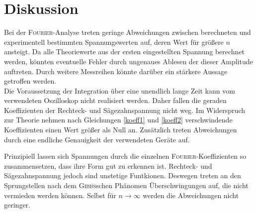 \section{Diskussion}
\label{sec:Diskussion}

Bei der \textsc{Fourier}-Analyse treten geringe Abweichungen zwischen berechneten und experimentell bestimmten Spannungswerten auf, deren Wert für größere $n$ ansteigt. 
Da alle Theoriewerte aus der ersten eingestellten Spannung berechnet werden, könnten eventuelle Fehler durch ungenaues Ablesen der dieser Amplitude auftreten. 
Durch weitere Messreihen könnte darüber ein stärkere Aussage getroffen werden.\\
Die Voraussetzung der Integration über eine unendlich lange Zeit kann vom verwendeten Oszilloskop nicht realisiert werden. 
Daher fallen die geraden Koeffizienten der Rechteck- und Sägezahnspannung nicht weg. 
Im Widerspruch zur Theorie nehmen nach Gleichungen \eqref{koeff1} und \eqref{koeff2} verschwindende Koeffizienten einen Wert größer als Null an.
Zusätzlich treten Abweichungen durch eine endliche Genauigkeit der verwendeten Geräte auf.

Prinzipiell lassen sich Spannungen durch die einzelnen \textsc{Fourier}-Koeffizienten so zusammensetzen, dass ihre Form gut zu erkennen ist. 
Rechteck- und Sägezahnspannung jedoch sind unstetige Funtkionen. 
Deswegen treten an den Sprungstellen nach dem \textsc{Gibbs}schen Phänomen Überschwingungen auf, die nicht vermieden werden können. 
Selbst für $n\to \infty$ werden die Abweichungen nicht geringer.
